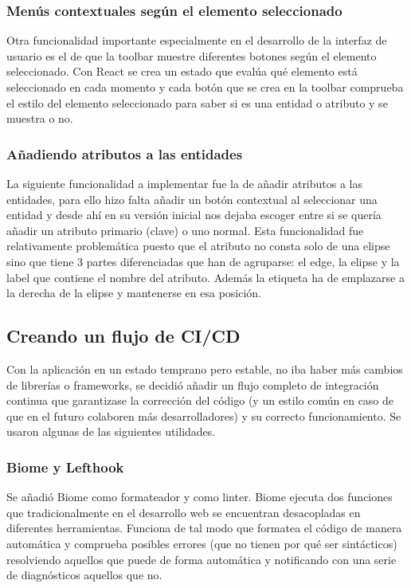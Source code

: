 \subsubsection{Menús contextuales según el elemento seleccionado}
Otra funcionalidad importante especialmente en el desarrollo de la interfaz de usuario es el de que la toolbar muestre diferentes botones según el elemento seleccionado.
Con React se crea un estado que evalúa qué elemento está seleccionado en cada momento y cada botón que se crea en la toolbar comprueba el estilo del elemento seleccionado para saber si es una entidad o atributo y se muestra o no.


\subsubsection{Añadiendo atributos a las entidades}
La siguiente funcionalidad a implementar fue la de añadir atributos a las entidades, para ello hizo falta añadir un botón contextual al seleccionar una entidad y desde ahí en su versión inicial nos dejaba escoger entre si se quería añadir un atributo primario (clave) o uno normal.
Esta funcionalidad fue relativamente problemática puesto que el atributo no consta solo de una elipse sino que tiene 3 partes diferenciadas que han de agruparse: el edge, la elipse y la label que contiene el nombre del atributo.
Además la etiqueta ha de emplazarse a la derecha de la elipse y mantenerse en esa posición.


\subsection{Creando un flujo de CI/CD}
Con la aplicación en un estado temprano pero estable, no iba haber más cambios de librerías o frameworks, se decidió añadir un flujo completo de integración continua que garantizase la corrección del código (y un estilo común en caso de que en el futuro colaboren más desarrolladores) y su correcto funcionamiento.
Se usaron algunas de las siguientes utilidades.
\subsubsection{Biome y Lefthook}
Se añadió Biome como formateador y como linter. Biome ejecuta dos funciones que tradicionalmente en el desarrollo web se encuentran desacopladas en diferentes herramientas. Funciona de tal modo que formatea el código de manera automática y comprueba posibles errores (que no tienen por qué ser sintácticos) resolviendo aquellos que puede de forma automática y notificando con una serie de diagnósticos aquellos que no.

